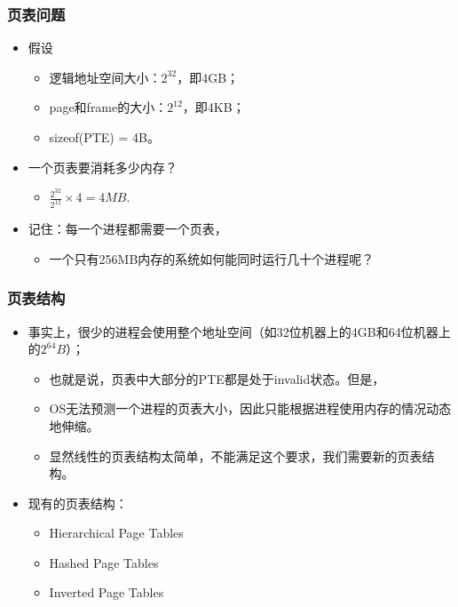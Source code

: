 \documentclass[CJKutf8,xcolor=pdftex,dvipsnames,table]{beamer}
\begin{document}
\begin{CJK*}{UTF8}{song}
  \begin{frame}
  \frametitle{页表问题} \pause
  \begin{itemize}
  \item{假设} \pause
    \begin{itemize}
    \item{逻辑地址空间大小：$2^{32}$，即4GB；} \pause
    \item{page和frame的大小：$2^{12}$，即4KB；} \pause
    \item{sizeof(PTE) = 4B。} \pause
    \end{itemize}
  \item{一个页表要消耗多少内存？} \pause
    \begin{itemize}
    \item{$\frac{2^{32}}{2^{12}}\times4 = 4MB$.} \pause
    \end{itemize}
  \item{记住：每一个进程都需要一个页表，} \pause
    \begin{itemize}
    \item{一个只有256MB内存的系统如何能同时运行几十个进程呢？}
    \end{itemize}
  \end{itemize}
  \end{frame}
  
  \begin{frame}
  \frametitle{页表结构} \pause
  \begin{itemize}
  \item{事实上，很少的进程会使用整个地址空间（如32位机器上的4GB和64位机器上的$2^{64}B$）；} \pause
    \begin{itemize}
    \item{也就是说，页表中大部分的PTE都是处于invalid状态。但是，} \pause
    \item{OS无法预测一个进程的页表大小，因此只能根据进程使用内存的情况动态地伸缩。} \pause
    \item{显然线性的页表结构太简单，不能满足这个要求，我们需要新的页表结构。} \pause
    \end{itemize}
  \item{现有的页表结构：} \pause
    \begin{itemize}
    \item{Hierarchical Page Tables} \pause
    \item{Hashed Page Tables} \pause
    \item{Inverted Page Tables}
    \end{itemize}
  \end{itemize}
  \end{frame}
  

\end{CJK*}
\end{document}
